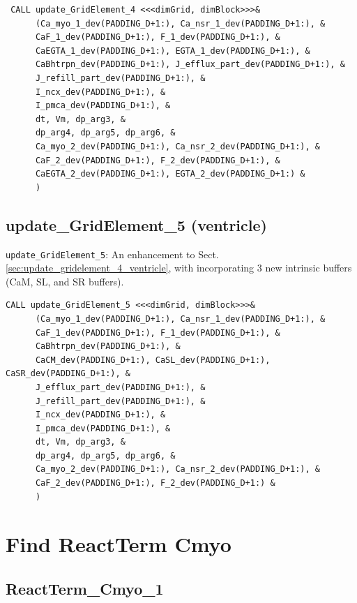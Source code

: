 {\small \begin{verbatim}
 CALL update_GridElement_4 <<<dimGrid, dimBlock>>>&        
      (Ca_myo_1_dev(PADDING_D+1:), Ca_nsr_1_dev(PADDING_D+1:), &    
      CaF_1_dev(PADDING_D+1:), F_1_dev(PADDING_D+1:), &    
      CaEGTA_1_dev(PADDING_D+1:), EGTA_1_dev(PADDING_D+1:), &       
      CaBhtrpn_dev(PADDING_D+1:), J_efflux_part_dev(PADDING_D+1:), &
      J_refill_part_dev(PADDING_D+1:), & 
      I_ncx_dev(PADDING_D+1:), &
      I_pmca_dev(PADDING_D+1:), &        
      dt, Vm, dp_arg3, &        
      dp_arg4, dp_arg5, dp_arg6, &       
      Ca_myo_2_dev(PADDING_D+1:), Ca_nsr_2_dev(PADDING_D+1:), &     
      CaF_2_dev(PADDING_D+1:), F_2_dev(PADDING_D+1:), &    
      CaEGTA_2_dev(PADDING_D+1:), EGTA_2_dev(PADDING_D+1:) &        
      )    
\end{verbatim}}


\subsection{update\_GridElement\_5 (ventricle)}
\label{sec:update_gridelement_5_ventricle}

\verb!update_GridElement_5!: An enhancement to
Sect.\ref{sec:update_gridelement_4_ventricle}, with incorporating 3 new
intrinsic buffers (CaM, SL, and SR buffers).

{\small \begin{verbatim}
CALL update_GridElement_5 <<<dimGrid, dimBlock>>>&
      (Ca_myo_1_dev(PADDING_D+1:), Ca_nsr_1_dev(PADDING_D+1:), &
      CaF_1_dev(PADDING_D+1:), F_1_dev(PADDING_D+1:), &
      CaBhtrpn_dev(PADDING_D+1:), &
      CaCM_dev(PADDING_D+1:), CaSL_dev(PADDING_D+1:), CaSR_dev(PADDING_D+1:), & 
      J_efflux_part_dev(PADDING_D+1:), &
      J_refill_part_dev(PADDING_D+1:), & 
      I_ncx_dev(PADDING_D+1:), &
      I_pmca_dev(PADDING_D+1:), &        
      dt, Vm, dp_arg3, &        
      dp_arg4, dp_arg5, dp_arg6, &       
      Ca_myo_2_dev(PADDING_D+1:), Ca_nsr_2_dev(PADDING_D+1:), &     
      CaF_2_dev(PADDING_D+1:), F_2_dev(PADDING_D+1:) &     
      )   
\end{verbatim}}

\section{Find ReactTerm Cmyo}

\subsection{ReactTerm\_Cmyo\_1}

